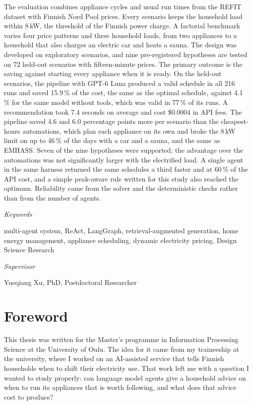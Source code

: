 \documentclass[12pt,a4paper]{report}
\newcommand{\unnumberedchapter}[1]{%
  \chapter*{#1}%
  \addcontentsline{toc}{chapter}{#1}%
}
\begin{document}
The evaluation combines appliance cycles and usual run times from the
REFIT dataset with Finnish Nord Pool prices. Every scenario keeps the
household load within 8\,kW, the threshold of the Finnish power charge.
A factorial benchmark varies four price patterns and three household
loads, from two appliances to a household that also charges an electric
car and heats a sauna. The design was developed on exploratory
scenarios, and nine pre-registered hypotheses are tested on 72 held-out
scenarios with fifteen-minute prices. The primary outcome is the saving
against starting every appliance when it is ready. On the held-out
scenarios, the pipeline with GPT-6 Luna produced a valid schedule in all
216 runs and saved 15.9\,\% of the cost, the same as the optimal
schedule, against 4.1\,\% for the same model without tools, which was
valid in 77\,\% of its runs. A recommendation took 7.4 seconds on
average and cost \$0.0004 in API fees. The pipeline saved 4.6 and 6.0
percentage points more per scenario than the cheapest-hours automations,
which plan each appliance on its own and broke the 8\,kW limit on up to
46\,\% of the days with a car and a sauna, and the same as EMHASS. Seven
of the nine hypotheses were supported; the advantage over the
automations was not significantly larger with the electrified load. A
single agent in the same harness returned the same schedules a third
faster and at 60\,\% of the API cost, and a simple peak-aware rule
written for this study also reached the optimum. Reliability came from
the solver and the deterministic checks rather than from the number of
agents.

\vspace{12pt}
{\sffamily\itshape Keywords}

\vspace{4pt}
multi-agent system, ReAct, LangGraph, retrieval-augmented generation,
home energy management, appliance scheduling, dynamic electricity
pricing, Design Science Research

\vspace{12pt}
{\sffamily\itshape Supervisor}

\vspace{4pt}
Yueqiang Xu, PhD, Postdoctoral Researcher

\unnumberedchapter{Foreword}

This thesis was written for the Master's programme in Information
Processing Science at the University of Oulu. The idea for it came from
my traineeship at the university, where I worked on an AI-assisted
service that tells Finnish households when to shift their electricity
use. That work left me with a question I wanted to study properly: can
language model agents give a household advice on when to run its
appliances that is worth following, and what does that advice cost to
produce?
\end{document}
